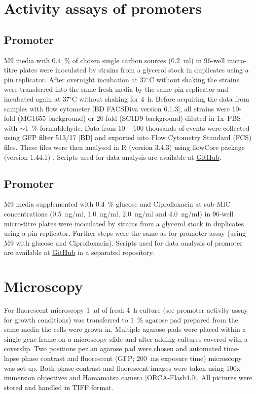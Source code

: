 \section{Activity assays of promoters}
\subsection{Promoter }
M9 media with 0.4~\% of chosen single carbon sources (0.2~ml) in 96-well micro-titre plates were inoculated by strains from a glycerol stock in duplicates using a pin replicator.
After overnight incubation at 37$^{\circ}$C without shaking the strains were transferred into the same fresh media by the same pin replicator and incubated again at 37$^{\circ}$C without shaking for 4~h.
Before acquiring the data from samples with flow cytometer [BD FACSDiva version 6.1.3], all strains were 10-fold (MG1655 background) or 20-fold (SC1\textunderscore D9 background) diluted in 1x~PBS with $\sim$1~\% formaldehyde.
Data from 10 -- 100 thousands of events were collected using GFP filter 513/17 [BD] and exported into Flow Cytometry Standard (FCS) files.
These files were then analysed in R (version 3.4.3) using flowCore package (version 1.44.1) \cite{hahne2009flowcore}.
Scripts used for data analysis are available at \href{https://github.com/marketavlkova/LacZ_FC}{GitHub}.

\subsection{Promoter }
M9 media supplemented with 0.4~\% glucose and Ciprofloxacin at sub-MIC concentrations (0.5~ng/ml, 1.0~ng/ml, 2.0~ng/ml and 4.0~ng/ml) in 96-well micro-titre plates were inoculated by strains from a glycerol stock in duplicates using a pin replicator.
Further steps were the same as for  promoter assay (using M9 with glucose and Ciprofloxacin).
Scripts used for data analysis of  promoter are available at \href{https://github.com/marketavlkova/RecA}{GitHub} in a separated repository.


\section{Microscopy}
For fluorescent microscopy 1~$\mu$l of fresh 4~h culture (see promoter activity assay for growth conditions) was transferred to 1~\% agarose pad prepared from the same media the cells were grown in.
Multiple agarose pads were placed within a single gene frame on a microscopy slide and after adding cultures covered with a coverslip.
Two positions per an agarose pad were chosen and automated time-lapse phase contrast and fluorescent (GFP; 200~ms exposure time) microscopy was set-up.
Both phase contrast and fluorescent images were taken using 100x immersion objectives and Hamamatsu camera [ORCA-Flash4.0].
All pictures were stored and handled in TIFF format.

\shorthandon{-} 
